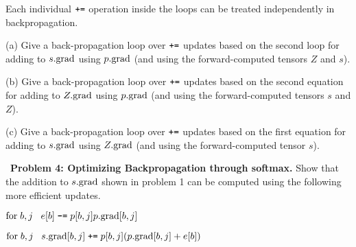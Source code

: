 \documentclass{article}
\newcommand{\solution}[1]{}
\begin{document}
\medskip
Each individual $\mbox{\tt +=}$ operation inside the loops can be treated independently in backpropagation.

\medskip
(a) Give a back-propagation loop over $\mbox{\tt +=}$ updates based on the second loop for adding to $s.\mathrm{grad}$ using $p.\mathrm{grad}$
(and using the forward-computed tensors $Z$ and $s$).

\solution{
  \medskip
  For $b,j\;\;\;s.\grad[b,j] \;\pluseq\; p.\grad[b,j]\exp(s[b,j])/Z[b]$}

\medskip
(b) Give a back-propagation loop over $\mbox{\tt +=}$ updates based on the second equation for adding to $Z.\mathrm{grad}$ using $p.\mathrm{grad}$
(and using the forward-computed tensors $s$ and $Z$).

\solution{
  \medskip
  For $b,j\;\;\;Z.\grad[b] \;\minuseq\; p.\grad[b,j]\exp(s[b,j])/Z[b]^2$}

\medskip
(c) Give a back-propagation loop over $\mbox{\tt +=}$ updates based on the first equation for adding to $s.\mathrm{grad}$ using $Z.\mathrm{grad}$
(and using the forward-computed tensor $s$).

\solution{
  \medskip
  For $b,j\;\;\;s.\grad[b,j] \;\pluseq\; Z.\grad[b]\exp(s[b,j])$}


\bigskip
~{\bf Problem 4:  Optimizing Backpropagation through softmax.} Show that the addition to $s.\mathrm{grad}$ shown in problem 1 can be computed using the following more efficient updates.

\medskip
$\mathrm{for}\;b,j\;\;\;e[b] \; \mbox{\tt -=} \; p[b,j]p.\mathrm{grad}[b,j]$

\medskip
$\mathrm{for}\;b,j\;\;\;s.\mathrm{grad}[b,j] \;\mbox{\tt +=} \; p[b,j](p.\mathrm{grad}[b,j] + e[b])$

\solution{
  The updates for problem 1 can be written as

  \medskip
  \begin{eqnarray*}
    \mathrm{for}\;b\;\;\;Z.\grad[b] & = & \sum_j \;-p.\grad[b,j]\exp(s[b,j])/Z[b]^2 \\
    & = & \left(\sum_j -p[b,j]p.\grad[b,j]\right)/Z[b] \\
    & = & e[b]/Z[b]
  \end{eqnarray*}

\begin{eqnarray*}
  \mathrm{for}\;b,j\;\;\;s.\grad[b,j] & = & p.\grad[b,j]\exp(s[b,j])/Z[b] + Z.\grad[b]\exp(s[b,j]) \\
  & = &  p.\grad[b,j]\left(\exp(s[b,j])/Z[b]\right) + e[b]\left(\exp(s[b,j])/Z[b]\right) \\
    & = &  p[b,j](p.\grad[b,j] +e[b])
\end{eqnarray*}

}
  
\end{document}
